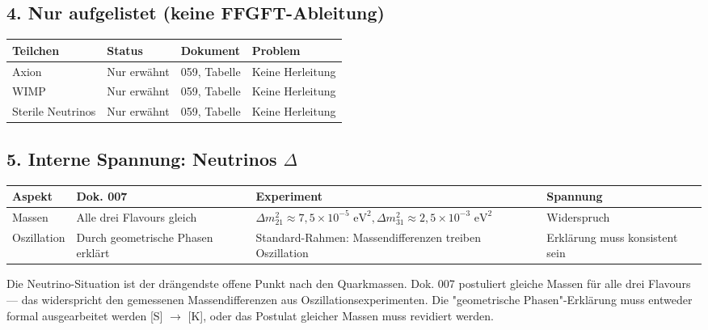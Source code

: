 \documentclass[11pt,a4paper]{article}
\begin{document}
	\subsection{4. Nur aufgelistet (keine FFGFT-Ableitung)}
	\begin{longtable}{p{3cm}p{2.5cm}p{2cm}p{8cm}}
		\toprule
		\textbf{Teilchen} & \textbf{Status} & \textbf{Dokument} & \textbf{Problem} \\
		\midrule
		\endhead
		\bottomrule
		\endfoot
		Axion & Nur erwähnt & 059, Tabelle & Keine Herleitung \\
		WIMP & Nur erwähnt & 059, Tabelle & Keine Herleitung \\
		Sterile Neutrinos & Nur erwähnt & 059, Tabelle & Keine Herleitung \\
	\end{longtable}
	
	\subsection{5. Interne Spannung: Neutrinos \texorpdfstring{$\Delta$}{Delta}}
	\begin{longtable}{p{2.5cm}p{3cm}p{4cm}p{6cm}}
		\toprule
		\textbf{Aspekt} & \textbf{Dok. 007} & \textbf{Experiment} & \textbf{Spannung} \\
		\midrule
		\endhead
		\bottomrule
		\endfoot
		Massen & Alle drei Flavours gleich & $\Delta m_{21}^2 \approx 7{,}5 \times 10^{-5}\text{ eV}^2, \Delta m_{31}^2 \approx 2{,}5 \times 10^{-3}\text{ eV}^2$ & Widerspruch \\
		Oszillation & Durch geometrische Phasen erklärt & Standard-Rahmen: Massendifferenzen treiben Oszillation & Erklärung muss konsistent sein \\
	\end{longtable}
	
	\begin{tcolorbox}[colback=red!5!white,colframe=red!75!black,title=Dringlichkeit Neutrino-Situation]
		Die Neutrino-Situation ist der drängendste offene Punkt nach den Quarkmassen. Dok. 007 postuliert gleiche Massen für alle drei Flavours — das widerspricht den gemessenen Massendifferenzen aus Oszillationsexperimenten. Die "geometrische Phasen"-Erklärung muss entweder formal ausgearbeitet werden [S] $\rightarrow$ [K], oder das Postulat gleicher Massen muss revidiert werden.
	\end{tcolorbox}
	
\end{document}
